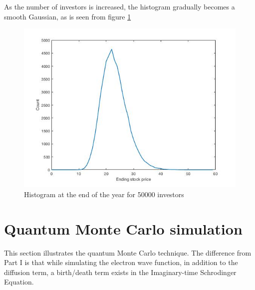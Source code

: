 \documentclass[11pt, oneside]{article}   	%
\begin{document}
As the number of investors is increased, the histogram gradually becomes a smooth Gaussian, as is seen from figure \ref{increase}
	\begin{figure}[!htbp] \label{increase}
	\centering
	\includegraphics[scale=0.5]{stockHistogram50000.jpg}
	\caption{Histogram at the end of the year for 50000 investors}
	\end{figure}

\pagebreak
\section{\vspace{-1ex}Quantum Monte Carlo simulation}
This section illustrates the quantum Monte Carlo technique. The difference from Part I is that while simulating the electron wave function, in addition to the diffusion term, a birth/death term exists in the Imaginary-time Schrodinger Equation. \vspace{-2ex}
\end{document}
